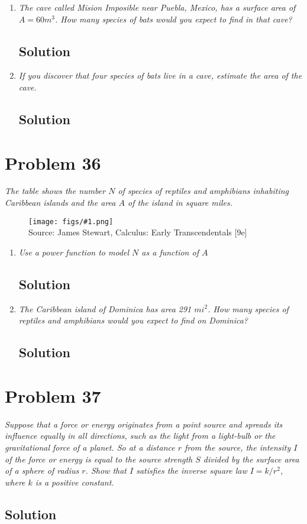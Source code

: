 \documentclass[11pt]{article}
\newcommand{\soln}{\subsection*}
\newcommand{\qn}{\textit}
\newcommand{\imagesource}[1]{{\footnotesize Source: #1}}
\newcommand{\imgqn}[1]{
	\begin{figure}[H]
		\centering
		\texttt{[image: figs/\#1.png]}\\
		\imagesource{James Stewart, Calculus: Early Transcendentals [9e]}
	\end{figure}
}
\begin{document}
\begin{enumerate}
	\item \qn{The cave called Mision Imposible near Puebla, Mexico, has a surface area of $A=60m^3$. How many species of bats would you expect to find in that cave?}
	\soln{Solution}
	
	\item \qn{If you discover that four species of bats live in a cave, estimate the area of the cave.}
	\soln{Solution}
\end{enumerate}

\section*{Problem 36}

\qn{The table shows the number $N$ of species of reptiles and amphibians inhabiting Caribbean islands and the area $A$ of the island in square miles.}

\imgqn{1.2.36}

\begin{enumerate}
	\item \qn{Use a power function to model $N$ as a function of $A$}
	\soln{Solution}
	
	\item \qn{The Caribbean island of Dominica has area 291 $mi^2$. How many species of reptiles and amphibians would you expect to find on Dominica?}
	\soln{Solution}
\end{enumerate}

\section*{Problem 37}

\qn{Suppose that a force or energy originates from a point source and spreads its influence equally in all directions, such as the light from a light-bulb or the gravitational force of a planet. So at a distance $r$ from the source, the intensity $I$ of the force or energy is equal to the source strength $S$ divided by the surface area of a sphere of radius $r$. Show that $I$ satisfies the inverse square law $I=k/r^2$, where $k$ is a positive constant.}

\soln{Solution}
\end{document}
